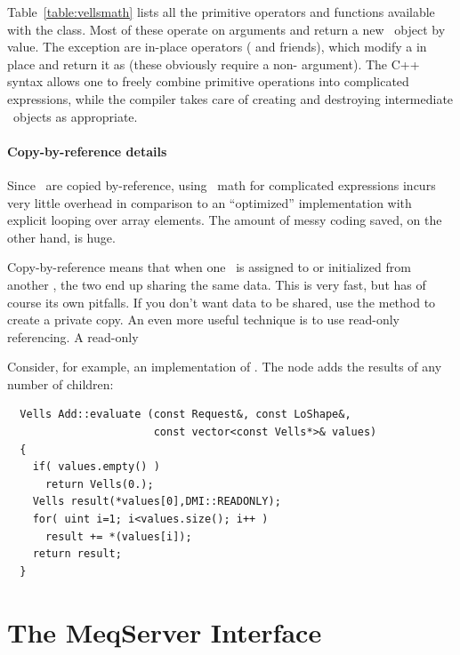   Table~\ref{table:vellsmath} lists all the primitive operators and functions 
  available with the  class. Most of these operate on 
  arguments and return a new \Vells\ object by value. The exception are 
  in-place operators ( and friends), which modify a  in
  place and return it as  (these obviously require a
  non- argument). The C++ syntax allows one to freely combine
  primitive operations into complicated expressions, while the compiler takes
  care of creating and destroying intermediate \Vells\ objects as appropriate.

  \subsubsection{Copy-by-reference details}

  Since \Vells\ are copied by-reference, using \Vells\ math for complicated
  expressions incurs very little overhead in comparison to an ``optimized''
  implementation with explicit looping over array elements. The amount of
  messy coding saved, on the other hand, is huge. 
  
  Copy-by-reference means that when one \Vells\ is assigned to or initialized
  from another \Vells, the two end up sharing the same data. This is very fast,
  but has of course its own pitfalls. If you don't want data to be shared, use
  the  method to create a private copy. An even more useful
  technique is to use read-only referencing. A read-only \Vells\ 
  
  Consider, for example, an
  implementation of . The  node adds the results of
  any number of children:

  \begin{verbatim}  
  Vells Add::evaluate (const Request&, const LoShape&,
                       const vector<const Vells*>& values)
  {
    if( values.empty() )
      return Vells(0.);
    Vells result(*values[0],DMI::READONLY);
    for( uint i=1; i<values.size(); i++ )
      result += *(values[i]);
    return result;
  }
  \end{verbatim}  
  
  


\chapter{The MeqServer Interface}
\label{chap:meqserver}
\label{sec:meqserver}
\label{sec:meqforest}

